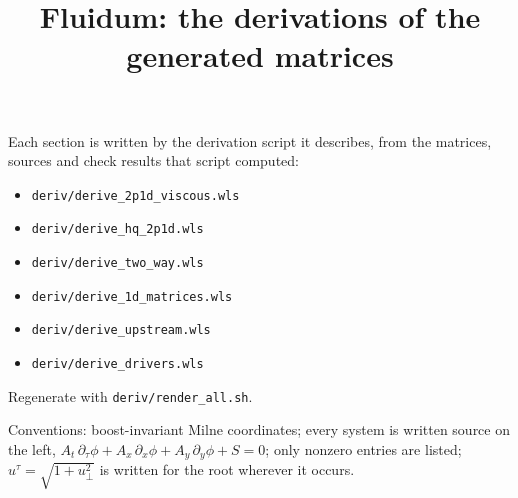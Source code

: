 \documentclass[10pt,a4paper]{article}
\title{Fluidum: the derivations of the generated matrices}
\author{}
\date{}
\begin{document}
\maketitle
\thispagestyle{empty}

Each section is written by the derivation script it describes, from the matrices, sources
and check results that script computed:
\begin{itemize}\setlength{\itemsep}{0pt}
\item \texttt{deriv/derive\_2p1d\_viscous.wls}
\item \texttt{deriv/derive\_hq\_2p1d.wls}
\item \texttt{deriv/derive\_two\_way.wls}
\item \texttt{deriv/derive\_1d\_matrices.wls}
\item \texttt{deriv/derive\_upstream.wls}
\item \texttt{deriv/derive\_drivers.wls}
\end{itemize}
Regenerate with \texttt{deriv/render\_all.sh}.

Conventions: boost-invariant Milne coordinates; every system is written source on the left,
$A_t\,\partial_\tau\phi + A_x\,\partial_x\phi + A_y\,\partial_y\phi + S = 0$; only nonzero
entries are listed; $u^\tau = \sqrt{1 + u_\perp^2}$ is written for the root wherever it occurs.

\tableofcontents
\clearpage


\clearpage

\clearpage

\clearpage

\clearpage

\clearpage

\clearpage
\appendix

\end{document}
